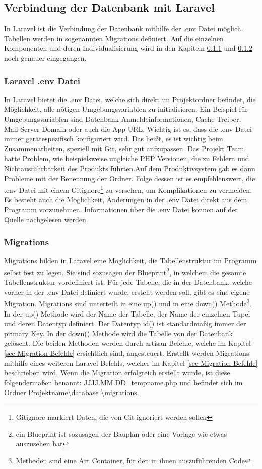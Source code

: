 \newpage
\subsection{Verbindung der Datenbank mit Laravel}
In Laravel ist die Verbindung  der Datenbank mithilfe der .env Datei möglich. Tabellen werden in sogenannten Migrations definiert. Auf die einzelnen Komponenten und deren Individualisierung wird in den Kapiteln \ref{sec:Laravel .env Datei} und \ref{sec:Migrations} noch genauer eingegangen.
\subsubsection{Laravel .env Datei } \label{sec:Laravel .env Datei}
In Laravel bietet die .env Datei, welche sich direkt im Projektordner befindet, die Möglichkeit, alle nötigen Umgebungsvariablen zu initialisieren. Ein Beispiel für Umgebungsvariablen sind Datenbank Anmeldeinformationen, Cache-Treiber, Mail-Server-Domain oder auch die App URL. Wichtig ist es, dass die .env Datei immer gerätespezifisch konfiguriert wird. Das heißt, es ist wichtig beim Zusammenarbeiten, speziell mit Git, sehr gut aufzupassen. Das Projekt Team hatte Problem, wie beispielsweise ungleiche PHP Versionen, die zu Fehlern und Nichtausführbarkeit des Produkts führten.Auf dem Produktivsystem gab es dann Probleme mit der Benennung der Ordner. Folge dessen ist es empfehlenswert, die .env Datei  mit einem Gitignore\footnote{Gitignore markiert Daten, die von Git ignoriert werden sollen} zu versehen, um Komplikationen zu vermeiden. Es besteht auch die Möglichkeit,  Änderungen in der .env Datei direkt aus dem Programm vorzunehmen. Informationen über die .env Datei können auf der Quelle \cite{Env} nachgelesen werden.

\subsubsection{Migrations}\label{sec:Migrations}
Migrations bilden in Laravel eine Möglichkeit, die Tabellenstruktur im Programm selbst fest zu legen. Sie sind sozusagen der Blueprint\footnote{ein Blueprint ist sozusagen der Bauplan oder eine Vorlage wie etwas auszusehen hat}, in welchem die gesamte Tabellenstruktur vordefiniert ist. Für jede Tabelle, die in der Datenbank, welche vorher in der  .env Datei  definiert wurde, erstellt werden soll, gibt es eine eigene Migration. Migrations sind unterteilt in eine up() und in eine down()  Methode\footnote{Methoden sind eine Art Container, für den in ihnen auszuführenden Code}. In der up() Methode wird der Name der Tabelle, der Name der einzelnen Tupel und deren Datentyp definiert. Der Datentyp id() ist standardmäßig immer der primary Key. 
In der down() Methode wird die Tabelle von der Datenbank gelöscht. Die beiden Methoden werden durch artisan Befehle, welche im Kapitel \ref{sec Migration Befehle} ersichtlich sind, angesteuert. 
Erstellt werden Migrations mithilfe eines weiteren Laravel Befehls, welcher im Kapitel \ref{sec Migration Befehle} beschrieben wird. Wenn die Migration erfolgreich erstellt wurde, ist diese folgendermaßen benannt: JJJJ.MM.DD\_tempname.php und befindet sich im Ordner Projektname\textbackslash database \textbackslash migrations.


